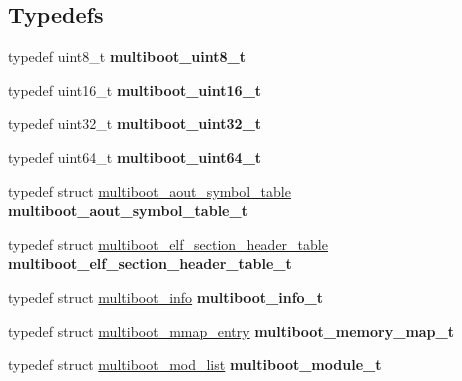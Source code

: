 \subsection*{Typedefs}
\begin{DoxyCompactItemize}
\item 
typedef uint8\+\_\+t {\bfseries multiboot\+\_\+uint8\+\_\+t}\hypertarget{group__multiboot__header_gab23a1e16655d01166cf36c3b3cfbcbe0}{}\label{group__multiboot__header_gab23a1e16655d01166cf36c3b3cfbcbe0}

\item 
typedef uint16\+\_\+t {\bfseries multiboot\+\_\+uint16\+\_\+t}\hypertarget{group__multiboot__header_ga035da1690ba0590036093e54d621565b}{}\label{group__multiboot__header_ga035da1690ba0590036093e54d621565b}

\item 
typedef uint32\+\_\+t {\bfseries multiboot\+\_\+uint32\+\_\+t}\hypertarget{group__multiboot__header_ga3d3bced0283c70170b0cd737f5a2719b}{}\label{group__multiboot__header_ga3d3bced0283c70170b0cd737f5a2719b}

\item 
typedef uint64\+\_\+t {\bfseries multiboot\+\_\+uint64\+\_\+t}\hypertarget{group__multiboot__header_gadf9e3c561d353c031507a26c89ea1d82}{}\label{group__multiboot__header_gadf9e3c561d353c031507a26c89ea1d82}

\item 
typedef struct \hyperlink{structmultiboot__aout__symbol__table}{multiboot\+\_\+aout\+\_\+symbol\+\_\+table} {\bfseries multiboot\+\_\+aout\+\_\+symbol\+\_\+table\+\_\+t}\hypertarget{group__multiboot__header_ga2f11acfde9ee0022a999f69d3e972352}{}\label{group__multiboot__header_ga2f11acfde9ee0022a999f69d3e972352}

\item 
typedef struct \hyperlink{structmultiboot__elf__section__header__table}{multiboot\+\_\+elf\+\_\+section\+\_\+header\+\_\+table} {\bfseries multiboot\+\_\+elf\+\_\+section\+\_\+header\+\_\+table\+\_\+t}\hypertarget{group__multiboot__header_ga2ea4dd45da23724e95b9fc701b41d1e0}{}\label{group__multiboot__header_ga2ea4dd45da23724e95b9fc701b41d1e0}

\item 
typedef struct \hyperlink{structmultiboot__info}{multiboot\+\_\+info} {\bfseries multiboot\+\_\+info\+\_\+t}\hypertarget{group__multiboot__header_ga8cb99862e8314c32c007eee9d2481ae1}{}\label{group__multiboot__header_ga8cb99862e8314c32c007eee9d2481ae1}

\item 
typedef struct \hyperlink{structmultiboot__mmap__entry}{multiboot\+\_\+mmap\+\_\+entry} {\bfseries multiboot\+\_\+memory\+\_\+map\+\_\+t}\hypertarget{group__multiboot__header_ga2aa16c58ceb6b9548aded205e46e8a3b}{}\label{group__multiboot__header_ga2aa16c58ceb6b9548aded205e46e8a3b}

\item 
typedef struct \hyperlink{structmultiboot__mod__list}{multiboot\+\_\+mod\+\_\+list} {\bfseries multiboot\+\_\+module\+\_\+t}\hypertarget{group__multiboot__header_ga84f7545f2c7b26164fed10a81bd052fd}{}\label{group__multiboot__header_ga84f7545f2c7b26164fed10a81bd052fd}

\end{DoxyCompactItemize}
